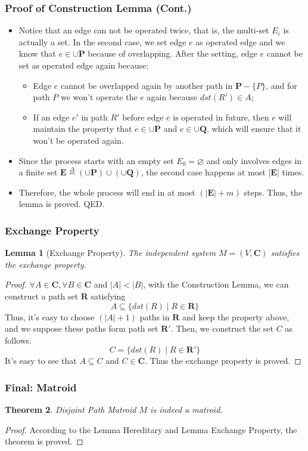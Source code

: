\documentclass[notheorems]{beamer}
\newtheorem{theorem}{Theorem}
\newtheorem{lemma}[theorem]{Lemma}
\begin{document}
\begin{frame}
\frametitle{Proof of Construction Lemma (Cont.)}
\begin{itemize}
\item Notice that an edge can not be operated twice, that is, the multi-set $E_i$ is actually a set. In the second case, we set edge $e$ as operated edge and we know that $e \in \cup{\mathbf{P}}$ because of overlapping. After the setting, edge $e$ cannot be set as operated edge again because:
    \begin{itemize}
    \item Edge $e$ cannot be overlapped again by another path in $\mathbf{P} - \{P\}$, and for path $P$ we won't operate the $e$ again because $dst(R') \in A$;
    \item If an edge $e'$ in path $R'$ before edge $e$ is operated in future, then $e$ will maintain the property that $e \in \cup\mathbf{P}$ and $e \in \cup\mathbf{Q}$, which will ensure that it won't be operated again.
    \end{itemize}
\item Since the process starts with an empty set $E_0 = \varnothing$ and only involves edges in a finite set $\mathbf{E} \stackrel{\Delta}{=} (\cup{\mathbf{P}}) \cup (\cup{\mathbf{Q}})$, the second case happens at most $|\mathbf{E}|$ times.
\item Therefore, the whole process will end in at most $(|\mathbf{E}| + m)$ steps. Thus, the lemma is proved. QED.
\end{itemize}
\end{frame}

\begin{frame}
\frametitle{Exchange Property}
\begin{lemma}[Exchange Property]
The independent system $M = (V, \mathbf{C})$ satisfies the exchange property.
\end{lemma}
\begin{proof}
$\forall A\in \mathbf{C}, \forall B\in \mathbf{C}$ and $|A| < |B|$, with the Construction Lemma, we can construct a path set $\mathbf{R}$ satisfying
\begin{displaymath}
A \subseteq \{dst(R) \mid R \in \mathbf{R}\}
\end{displaymath}
Thus, it's easy to choose $(|A| + 1)$ paths in $\mathbf{R}$ and keep the property above, and we suppose these paths form path set $\mathbf{R}'$. Then, we construct the set $C$ as follows.
\begin{displaymath}
C = \{dst(R) \mid R \in \mathbf{R}'\}
\end{displaymath}
It's easy to see that $A \subseteq C$ and $C \in \mathbf{C}$. Thus the exchange property is proved.
\end{proof}
\end{frame}

\begin{frame}
\frametitle{Final: Matroid}
\begin{theorem}
Disjoint Path Matroid $M$ is indeed a matroid.
\end{theorem}
\begin{proof}
According to the Lemma Hereditary and Lemma Exchange Property, the theorem is proved.
\end{proof}
\end{frame}
\end{document}
